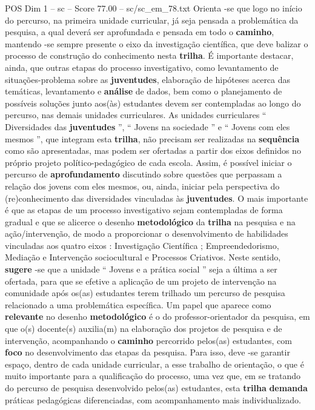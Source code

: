 \begin{textsample}{POS Dim 1 – sc – Score 77.00 – sc/sc\_em\_78.txt}
Orienta -se que logo no início do percurso, na primeira unidade curricular, já seja pensada a problemática da pesquisa, a qual deverá ser aprofundada e pensada em todo o \textbf{caminho}, mantendo -se sempre presente o eixo da investigação científica, que deve balizar o processo de construção do conhecimento nesta \textbf{trilha}.
É importante destacar, ainda, que outras etapas do processo investigativo, como levantamento de situações-problema sobre as \textbf{juventudes}, elaboração de hipóteses acerca das temáticas, levantamento e \textbf{análise} de dados, bem como o planejamento de possíveis soluções junto aos(às) estudantes devem ser contempladas ao longo do percurso, nas demais unidades curriculares.
As unidades curriculares “ Diversidades das \textbf{juventudes} ”, “ Jovens na sociedade ” e “ Jovens com eles mesmos ”, que integram esta \textbf{trilha}, não precisam ser realizadas na \textbf{sequência} como são apresentadas, mas podem ser ofertadas a partir dos eixos definidos no próprio projeto político-pedagógico de cada escola.
Assim, é possível iniciar o percurso de \textbf{aprofundamento} discutindo sobre questões que perpassam a relação dos jovens com eles mesmos, ou, ainda, iniciar pela perspectiva do (re)conhecimento das diversidades vinculadas às \textbf{juventudes}.
O mais importante é que as etapas de um processo investigativo sejam contempladas de forma gradual e que se alicerce o desenho \textbf{metodológico} da \textbf{trilha} na pesquisa e na ação/intervenção, de modo a proporcionar o desenvolvimento de habilidades vinculadas aos quatro eixos : Investigação Científica ; Empreendedorismo, Mediação e Intervenção sociocultural e Processos Criativos.
Neste sentido, \textbf{sugere} -se que a unidade “ Jovens e a prática social ” seja a última a ser ofertada, para que se efetive a aplicação de um projeto de intervenção na comunidade após os(as) estudantes terem trilhado um percurso de pesquisa relacionado a uma problemática específica.
Um papel que aparece como \textbf{relevante} no desenho \textbf{metodológico} é o do professor-orientador da pesquisa, em que o(s) docente(s) auxilia(m) na elaboração dos projetos de pesquisa e de intervenção, acompanhando o \textbf{caminho} percorrido pelos(as) estudantes, com \textbf{foco} no desenvolvimento das etapas da pesquisa.
Para isso, deve -se garantir espaço, dentro de cada unidade curricular, a esse trabalho de orientação, o que é muito importante para a qualificação do processo, uma vez que, em se tratando do percurso de pesquisa desenvolvido pelos(as) estudantes, esta \textbf{trilha} \textbf{demanda} práticas pedagógicas diferenciadas, com acompanhamento mais individualizado.

\end{textsample}
